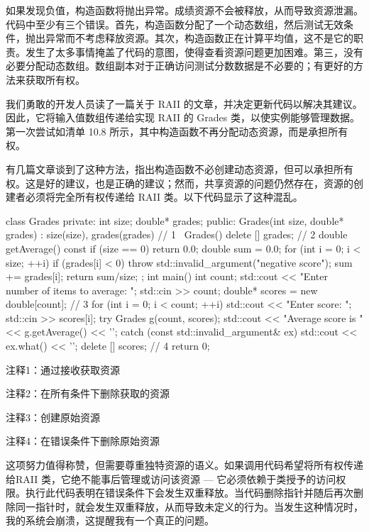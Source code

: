 
如果发现负值，构造函数将抛出异常。成绩资源不会被释放，从而导致资源泄漏。代码中至少有三个错误。首先，构造函数分配了一个动态数组，然后测试无效条件，抛出异常而不考虑释放资源。其次，构造函数正在计算平均值，这不是它的职责。发生了太多事情掩盖了代码的意图，使得查看资源问题更加困难。第三，没有必要分配动态数组。数组副本对于正确访问测试分数数据是不必要的；有更好的方法来获取所有权。

我们勇敢的开发人员读了一篇关于 RAII 的文章，并决定更新代码以解决其建议。因此，它将输入值数组传递给实现 RAII 的 Grades 类，以使实例能够管理数据。第一次尝试如清单 10.8 所示，其中构造函数不再分配动态资源，而是承担所有权。

有几篇文章谈到了这种方法，指出构造函数不必创建动态资源，但可以承担所有权。这是好的建议，也是正确的建议；然而，共享资源的问题仍然存在，资源的创建者必须将完全所有权传递给 RAII 类。以下代码显示了这种混乱。


\begin{cpp}
class Grades {
private:
  int size;
  double* grades;
public:
  Grades(int size, double* grades) : size(size),
  grades(grades) {} // 1
  ~Grades() { delete [] grades; } // 2
  double getAverage() const {
    if (size == 0)
      return 0.0;
    double sum = 0.0;
    for (int i = 0; i < size; ++i) {
      if (grades[i] < 0)
        throw std::invalid_argument("negative score");
      sum += grades[i];
    }
    return sum/size;
  }
};
int main() {
  int count;
  std::cout << "Enter number of items to average: ";
  std::cin >> count;
  double* scores = new double[count]; // 3
  for (int i = 0; i < count; ++i) {
    std::cout << "Enter score: ";
    std::cin >> scores[i];
  }
  try {
    Grades g(count, scores);
    std::cout << "Average score is " << g.getAverage() << '\n';
  } catch (const std::invalid_argument& ex) {
    std::cout << ex.what() << '\n';
    delete [] scores; // 4
  }
  return 0;
}
\end{cpp}

{\footnotesize
注释1：通过接收获取资源

注释2：在所有条件下删除获取的资源

注释3：创建原始资源

注释4：在错误条件下删除原始资源
}

这项努力值得称赞，但需要尊重独特资源的语义。如果调用代码希望将所有权传递给RAII 类，它绝不能事后管理或访问该资源 — 它必须依赖于类授予的访问权限。执行此代码表明在错误条件下会发生双重释放。当代码删除指针并随后再次删除同一指针时，就会发生双重释放，从而导致未定义的行为。当发生这种情况时，我的系统会崩溃，这提醒我有一个真正的问题。

